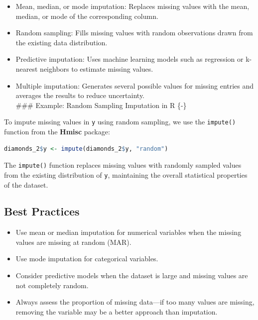 \documentclass[
]{book}
\newcommand{\passthrough}[1]{#1}
\providecommand{\tightlist}{%
  \setlength{\itemsep}{0pt}\setlength{\parskip}{0pt}}
\theoremstyle{definition}
\theoremstyle{definition}
\theoremstyle{definition}
\theoremstyle{definition}
\theoremstyle{remark}
\begin{document}
\begin{itemize}
\tightlist
\item
  Mean, median, or mode imputation: Replaces missing values with the mean, median, or mode of the corresponding column.\\
\item
  Random sampling: Fills missing values with random observations drawn from the existing data distribution.\\
\item
  Predictive imputation: Uses machine learning models such as regression or k-nearest neighbors to estimate missing values.\\
\item
  Multiple imputation: Generates several possible values for missing entries and averages the results to reduce uncertainty.\\
  \#\#\# Example: Random Sampling Imputation in R \{-\}
\end{itemize}

To impute missing values in \passthrough{\lstinline!y!} using random sampling, we use the \passthrough{\lstinline!impute()!} function from the \textbf{Hmisc} package:

\begin{lstlisting}[language=R]
diamonds_2$y <- impute(diamonds_2$y, "random")
\end{lstlisting}

The \passthrough{\lstinline!impute()!} function replaces missing values with randomly sampled values from the existing distribution of \passthrough{\lstinline!y!}, maintaining the overall statistical properties of the dataset.

\subsection*{Best Practices}\label{best-practices}

\begin{itemize}
\tightlist
\item
  Use mean or median imputation for numerical variables when the missing values are missing at random (MAR).\\
\item
  Use mode imputation for categorical variables.\\
\item
  Consider predictive models when the dataset is large and missing values are not completely random.\\
\item
  Always assess the proportion of missing data---if too many values are missing, removing the variable may be a better approach than imputation.
\end{itemize}
\end{document}
